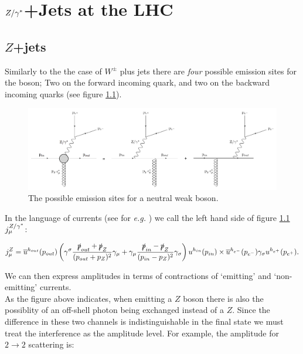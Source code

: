 \chapter{${Z/\gamma^*}$+Jets at the LHC}
\label{sub:Zs}

	\section{$Z$+jets}
	\label{sec:Zcurrents}

		Similarly to the the case of $W^\pm$ plus jets there are \emph{four} possible emission sites for the boson; Two on the forward incoming quark, and two on the backward incoming quarks (see figure \ref{fig:emissionsites}).

		\begin{figure}[h]
		\includegraphics[width=0.98\linewidth]{figures/EmissionSites.pdf}
		\caption{The possible emission sites for a neutral weak boson.}
		\label{fig:emissionsites}
		\end{figure}

		In the language of currents (see for \emph{e.g.} \cite{Constructing}) we call the left hand side of figure \ref{fig:emissionsites} $j_\mu^{Z/\gamma^*}$:

		\begin{equation}
		j_\mu^Z = \overline{u}^{h_{out}}(p_{out})\left(\gamma^\sigma\frac{\slashed p_{out} + \slashed p_Z}{(p_{out} + p_Z)^2}\gamma_\mu + \gamma_\mu\frac{\slashed p_{in} - \slashed p_Z}{(p_{in} - p_Z)^2}\gamma_\sigma\right)u^{h_{in}}(p_{in})\times\overline{u}^{h_{e^-}}(p_{e^-})\gamma_\sigma u^{h_{e^+}}(p_{e^+}).
		\end{equation}

		We can then express amplitudes in terms of contractions of `emitting' and `non-emitting' currents.\\As the figure above indicates, when emitting a $Z$ boson there is also the possiblity of an off-shell photon being exchanged instead of a $Z$.  Since the difference in these two channels is indistinguishable 	in the final state we must treat the interference as the amplitude level.  For example, the amplitude for $2\rightarrow 2$ scattering is:

